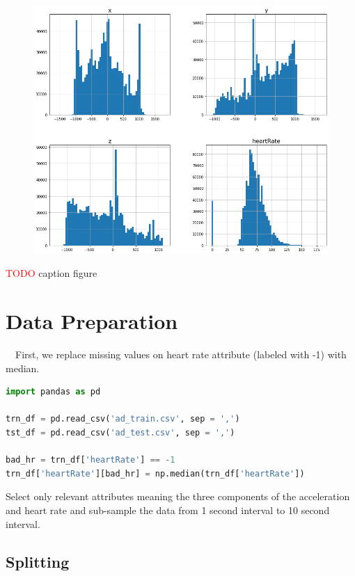\begin{figure}[H]
\centering
  \includegraphics[scale=0.4]{img/task_2/histograms.png}
  \caption{}
  \label{fig: }
\end{figure}

\textcolor{red}{TODO} caption figure





\section*{Data Preparation}\label{Data Preparation}

~~First, we replace missing values on heart rate attribute (labeled with -1) with median.

\begin{lstlisting}[language=Python]
import pandas as pd

trn_df = pd.read_csv('ad_train.csv', sep = ',')
tst_df = pd.read_csv('ad_test.csv', sep = ',')

bad_hr = trn_df['heartRate'] == -1
trn_df['heartRate'][bad_hr] = np.median(trn_df['heartRate'])
\end{lstlisting}

Select only relevant attributes meaning the three components of the acceleration and heart rate and sub-sample the data from 1 second interval to 10 second interval.

\subsection*{Splitting}\label{Splitting}

